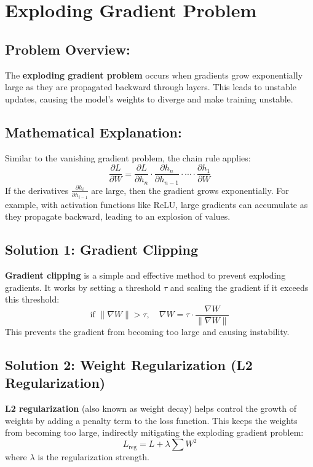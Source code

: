 \documentclass[10pt]{article}
\begin{document}
\section{ Exploding Gradient Problem}

\subsection{ Problem Overview:}
The {\bf exploding gradient problem} occurs when gradients grow exponentially large as they are propagated backward through layers. This leads to unstable updates, causing the model's weights to diverge and make training unstable.

\subsection{ Mathematical Explanation:}
Similar to the vanishing gradient problem, the chain rule applies:
\[
\frac{\partial L}{\partial W} = \frac{\partial L}{\partial h_n} \cdot \frac{\partial h_n}{\partial h_{n-1}} \cdot \cdots \cdot \frac{\partial h_1}{\partial W}
\]
If the derivatives \( \frac{\partial h_i}{\partial h_{i-1}} \) are large, then the gradient grows exponentially. For example, with activation functions like ReLU, large gradients can accumulate as they propagate backward, leading to an explosion of values.

\subsection{ Solution 1: Gradient Clipping}
{\bf Gradient clipping} is a simple and effective method to prevent exploding gradients. It works by setting a threshold \( \tau \) and scaling the gradient if it exceeds this threshold:
\[
\text{if } \|\nabla W\| > \tau, \quad \nabla W = \tau \cdot \frac{\nabla W}{\|\nabla W\|}
\]
This prevents the gradient from becoming too large and causing instability.

\subsection{ Solution 2: Weight Regularization (L2 Regularization)}
{\bf L2 regularization} (also known as weight decay) helps control the growth of weights by adding a penalty term to the loss function. This keeps the weights from becoming too large, indirectly mitigating the exploding gradient problem:
\[
L_{\text{reg}} = L + \lambda \sum W^2
\]
where \( \lambda \) is the regularization strength.
\end{document}
